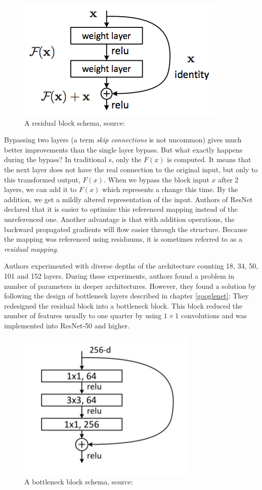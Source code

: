 \begin{figure}[H]
   \centering
	\includegraphics[width=0.4\linewidth]{./pictures/residual-block.png}
	\caption[Residual block]{A residual block schema, source: \cite{resnet}}
      \label{fig:res-block}
\end{figure}

Bypassing two layers (a term \textit{skip connections} is not uncommon) gives much better improvements than the single layer bypass. But what exactly happens during the bypass? In traditional s, only the $F(x)$ is computed. It means that the next layer does not have the real connection to the original input, but only to this transformed output, $F(x)$. When we bypass the block input $x$ after 2 layers, we can add it to $F(x)$ which represents a change this time. By the addition, we get a mildly altered representation of the input. Authors of ResNet declared that it is easier to optimize this referenced mapping instead of the unreferenced one. Another advantage is that with addition operations, the backward propagated gradients will flow easier through the structure. Because the mapping was referenced using residuums, it is sometimes referred to as a \textit{residual mapping}.

Authors experimented with diverse depths of the architecture counting 18, 34, 50, 101 and 152 layers. During these experiments, authors found a problem in number of parameters in deeper architectures. However, they found a solution by following the design of bottleneck layers described in chapter \ref{googlenet}: They redesigned the residual block into a bottleneck block. This block reduced the number of features usually to one quarter by using $1 \times 1$ convolutions and was implemented into ResNet-50 and higher.

\begin{figure}[H]
   \centering
	\includegraphics[width=0.4\linewidth]{./pictures/bottleneck-block.jpg}
	\caption[Bottleneck block]{A bottleneck block schema, source: \cite{resnet}}
      \label{fig:bottleneck-block}
\end{figure}

